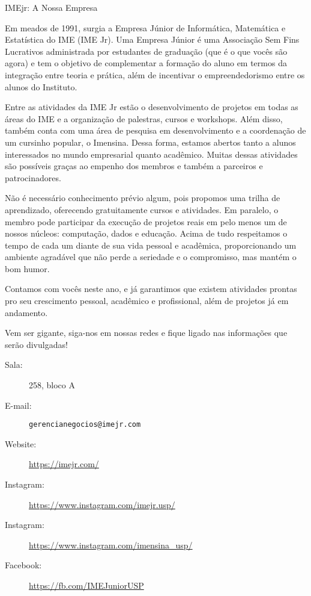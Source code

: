 \begin{subsecao}{IMEjr: A Nossa Empresa}


Em meados de 1991, surgia a Empresa Júnior de Informática, Matemática e Estatística 
do IME (IME Jr). Uma Empresa Júnior é uma Associação Sem Fins Lucrativos administrada 
por estudantes de graduação (que é o que vocês são agora) e tem o objetivo de complementar 
a formação do aluno em termos da integração entre teoria e prática, além de incentivar 
o empreendedorismo entre os alunos do Instituto. 

Entre as atividades da IME Jr estão o desenvolvimento de projetos em todas as áreas do IME 
e a organização de palestras, cursos e workshops. Além disso, também conta com uma área de 
pesquisa em desenvolvimento e a coordenação de um cursinho popular, o Imensina. Dessa forma, 
estamos abertos tanto a alunos interessados no mundo empresarial quanto acadêmico. Muitas 
dessas atividades são possíveis graças ao empenho dos membros e também a parceiros e patrocinadores. 

Não é necessário conhecimento prévio algum, pois propomos uma trilha de aprendizado, oferecendo 
gratuitamente cursos e atividades. Em paralelo, o membro pode participar da execução de projetos 
reais em pelo menos um de nossos núcleos: computação, dados e educação. Acima de tudo respeitamos 
o tempo de cada um diante de sua vida pessoal e acadêmica, proporcionando um ambiente agradável que 
não perde a seriedade e o compromisso, mas mantém o bom humor.

Contamos com vocês neste ano, e já garantimos que existem atividades prontas pro seu crescimento pessoal, 
acadêmico e profissional, além de projetos já em andamento.

Vem ser gigante, siga-nos em nossas redes e fique ligado nas informações que serão divulgadas!

\begin{description}
\item [Sala:] 258, bloco A
\item[E-mail:] \texttt{gerencianegocios@imejr.com}
\item[Website:] \url{https://imejr.com/}
\item[Instagram:] \url{https://www.instagram.com/imejr.usp/}
\item[Instagram:] \url{https://www.instagram.com/imensina_usp/}
\item[Facebook:] \url{https://fb.com/IMEJuniorUSP}
\end{description}

\end{subsecao}
